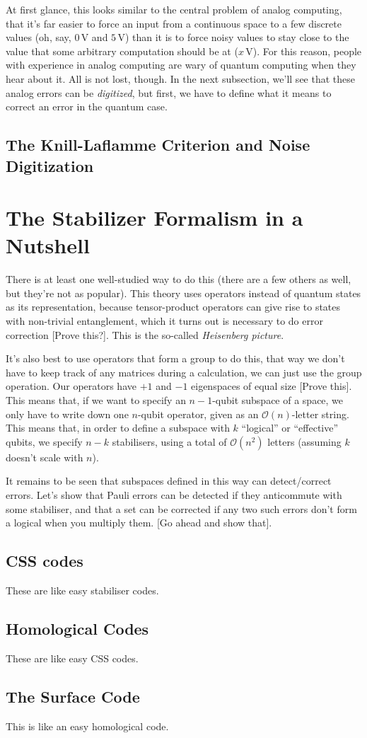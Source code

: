 \documentclass[10pt,a4paper, english]{scrartcl}
\providecommand{\volts}{\, \textrm{V}}
\begin{document}
At first glance, this looks similar to the central problem of analog computing, that it's far easier to force an input from a continuous space to a few discrete values (oh, say, $0 \volts$ and $5 \volts$) than it is to force noisy values to stay close to the value that some arbitrary computation should be at ($x \volts$). 
For this reason, people with experience in analog computing are wary of quantum computing when they hear about it. 
All is not lost, though. 
In the next subsection, we'll see that these analog errors can be \emph{digitized}, but first, we have to define what it means to correct an error in the quantum case.
\subsection{The Knill-Laflamme Criterion and Noise Digitization}

\section{The Stabilizer Formalism in a Nutshell}
There is at least one well-studied way to do this (there are a few others as well, but they're not as popular).
This theory uses operators instead of quantum states as its representation, because tensor-product operators can give rise to states with non-trivial entanglement, which it turns out is necessary to do error correction [Prove this?].
This is the so-called \emph{Heisenberg picture}. 

It's also best to use operators that form a group to do this, that way we don't have to keep track of any matrices during a calculation, we can just use the group operation. 
Our operators have $+1$ and $-1$ eigenspaces of equal size [Prove this]. 
This means that, if we want to specify an $n-1$-qubit subspace of a space, we only have to write down one $n$-qubit operator, given as an $\mathcal{O}(n)$-letter string. 
This means that, in order to define a subspace with $k$ ``logical'' or ``effective'' qubits, 
we specify $n-k$ stabilisers, using a total of $\mathcal{O}(n^2)$ letters (assuming $k$ doesn't scale with $n$).

It remains to be seen that subspaces defined in this way can detect/correct errors.
Let's show that Pauli errors can be detected if they anticommute with some stabiliser, and that a set can be corrected if any two such errors don't form a logical when you multiply them.
[Go ahead and show that].
\subsection{CSS codes}
These are like easy stabiliser codes.
\subsection{Homological Codes}
These are like easy CSS codes.
\subsection{The Surface Code}
This is like an easy homological code.
\end{document}
